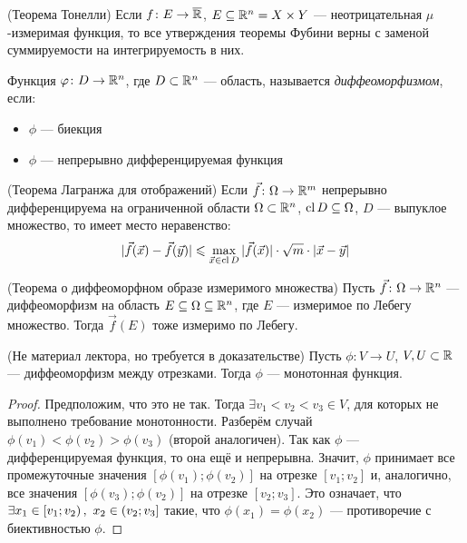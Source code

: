 \begin{corollary} (Теорема Тонелли)
	Если $f \colon E \to \overline{\mathbb{R}}$, $E \subseteq \mathbb{R}^n = X \times Y$ --- неотрицательная $\mu$-измеримая функция, то все утверждения теоремы Фубини верны с заменой суммируемости на интегрируемость в них.
\end{corollary}

\begin{reminder}
	Функция $\varphi \colon D \to \mathbb{R}^n$, где $D \subset \mathbb{R}^n$ --- область, называется \textit{диффеоморфизмом}, если:
	\begin{itemize}
		\item $\phi$ --- биекция
		
		\item $\phi$ --- непрерывно дифференцируемая функция
	\end{itemize}
\end{reminder}

\begin{reminder} (Теорема Лагранжа для отображений)
	Если $\vec{f} \colon \Omega \to \mathbb{R}^m$ непрерывно дифференцируема на ограниченной области $\Omega \subset \mathbb{R}^n$, $\operatorname{cl} D \subseteq \Omega$, $D$ --- выпуклое множество, то имеет место неравенство:
	\[
		|\vec{f}(\vec{x}) - \vec{f}(\vec{y})| \leqslant \max_{\vec{x} \in \operatorname{cl} D} |\vec{f}(\vec{x})| \cdot \sqrt{m} \cdot |\vec{x} - \vec{y}|
	\]
\end{reminder}

\begin{reminder} (Теорема о диффеоморфном образе измеримого множества)
	Пусть $\vec{f} \colon \Omega \to \mathbb{R}^n$ --- диффеоморфизм на область $E \subseteq \Omega \subseteq \mathbb{R}^n$, где $E$ --- измеримое по Лебегу множество. Тогда $\vec{f}(E)$ тоже измеримо по Лебегу.
\end{reminder}

\begin{proposition} (Не материал лектора, но требуется в доказательстве)
	Пусть $\phi \colon V \to U$, $V, U \subset \mathbb{R}$ --- диффеоморфизм между отрезками. Тогда $\phi$ --- монотонная функция.
\end{proposition}

\begin{proof}
	Предположим, что это не так. Тогда $\exists v_1 < v_2 < v_3 \in V$, для которых не выполнено требование монотонности. Разберём случай $\phi(v_1) < \phi(v_2) > \phi(v_3)$ (второй аналогичен). Так как $\phi$ --- дифференцируемая функция, то она ещё и непрерывна. Значит, $\phi$ принимает все промежуточные значения $[\phi(v_1); \phi(v_2)]$ на отрезке $[v_1; v_2]$ и, аналогично, все значения $[\phi(v_3); \phi(v_2)]$ на отрезке $[v_2; v_3]$. Это означает, что $\exists x_1 \in \left[v_1; v_2\right),\ x_2 \in \left(v_2; v_3\right]$ такие, что $\phi(x_1) = \phi(x_2)$ --- противоречие с биективностью $\phi$.
\end{proof}

